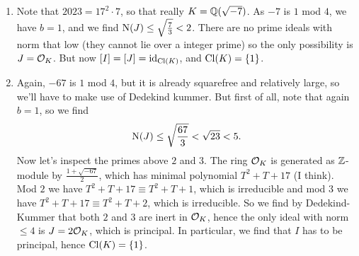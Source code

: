 \documentclass[a4paper,11pt]{article}
\begin{document}
\begin{enumerate}[labelindent=0pt, wide]
    \item Note that $2023 = 17^2 \cdot 7$, so that really $K = \mathbb{Q}(\sqrt{-7})$. 
        As $-7$ is $1$ mod $4$, we have $b=1$, and we find 
        $\operatorname{N}(J) \leq \sqrt {\frac 73} < 2$. There are no prime ideals with
        norm that low (they cannot lie over a integer prime) so the only possibility
        is $J = \mathcal{O}_K$. But now $[I] = [J] = \operatorname{id}_{\operatorname{Cl}(K)}$, and 
        $\operatorname{Cl}(K) = \{1\}$.
    \item Again, $-67$ is $1$ mod $4$, but it is already squarefree and
        relatively large, so we'll have to make use of Dedekind kummer. But first of all,
        note that again $b =1$, so we find
        \begin{equation*}
            \operatorname{N}(J) \leq \sqrt{\frac{67}3} < \sqrt{23} < 5.
        \end{equation*}
        Now let's inspect the primes above $2$ and $3$. 
        The ring $\mathcal{O}_K$ is generated as $\mathbb{Z}$-module by 
        $\frac{1+\sqrt{-67}}2$, which has minimal polynomial $T^2 + T + 17$ (I think).
        Mod $2$ we have 
        $T^2 + T + 17 \equiv T^2+ T + 1 $, which is irreducible and mod $3$ we have 
        $T^2 + T + 17 \equiv T^2 + T + 2$, which is irreducible. So we find by
        Dedekind-Kummer that both $2$ and $3$ are inert in $\mathcal{O}_K$, hence the only
        ideal with norm $\leq 4$ is $J = 2\mathcal{O}_K$, which is principal. In particular, 
        we find that $I$ has to be principal, hence $\operatorname{Cl}(K) = \{1\}$.
\end{enumerate}


\contactend
\end{document}
